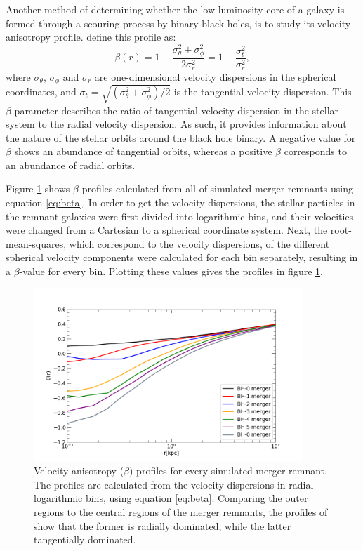 \documentclass[english, twoside]{HYgradu}
\begin{document}
Another method of determining whether the low-luminosity core of a galaxy is formed through a scouring process by binary black holes, is to study its velocity anisotropy profile. \cite{BinneyTremaine} define this profile as:
\begin{equation}
\beta(r) = 1 - \frac{\sigma_\theta^2 + \sigma_\phi^2}{2\sigma_r^2} = 1 - \frac{\sigma_t^2}{\sigma_r^2}, \label{eq:beta}
\end{equation}
where $\sigma_\theta$, $\sigma_\phi$ and $\sigma_r$ are one-dimensional velocity dispersions in the spherical coordinates, and $\sigma_t = \sqrt{(\sigma_\theta^2 + \sigma_\phi^2) / 2}$ is the tangential velocity dispersion. This $\beta$-parameter describes the ratio of tangential velocity dispersion in the stellar system to the radial velocity dispersion. As such, it provides information about the nature of the stellar orbits around the black hole binary. A negative value for $\beta$ shows an abundance of tangential orbits, whereas a positive $\beta$ corresponds to an abundance of radial orbits. 

Figure \ref{figure:beta_no_rb} shows $\beta$-profiles calculated from all of simulated merger remnants using equation \ref{eq:beta}. In order to get the velocity dispersions, the stellar particles in the remnant galaxies were first divided into logarithmic bins, and their velocities were changed from a Cartesian to a spherical coordinate system. Next, the root-mean-squares, which correspond to the velocity dispersions, of the different spherical velocity components were calculated for each bin separately, resulting in a $\beta$-value for every bin. Plotting these values gives the profiles in figure \ref{figure:beta_no_rb}. 

\begin{figure}
	\centering
	\includegraphics[width=0.9\textwidth]{beta_no_rb.png}
	\caption{Velocity anisotropy ($\beta$) profiles for every simulated merger remnant. The profiles are calculated from the velocity dispersions in radial logarithmic bins, using equation \ref{eq:beta}. Comparing the outer regions to the central regions of the merger remnants, the profiles of show that the former is radially dominated, while the latter tangentially dominated.}
	\label{figure:beta_no_rb}
\end{figure}
\end{document}
